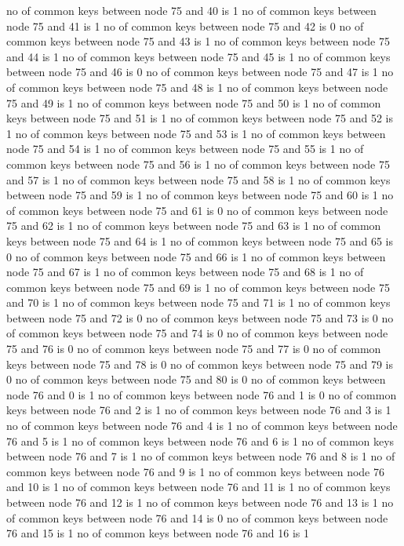 no of common keys between node 75 and 40 is 1
no of common keys between node 75 and 41 is 1
no of common keys between node 75 and 42 is 0
no of common keys between node 75 and 43 is 1
no of common keys between node 75 and 44 is 1
no of common keys between node 75 and 45 is 1
no of common keys between node 75 and 46 is 0
no of common keys between node 75 and 47 is 1
no of common keys between node 75 and 48 is 1
no of common keys between node 75 and 49 is 1
no of common keys between node 75 and 50 is 1
no of common keys between node 75 and 51 is 1
no of common keys between node 75 and 52 is 1
no of common keys between node 75 and 53 is 1
no of common keys between node 75 and 54 is 1
no of common keys between node 75 and 55 is 1
no of common keys between node 75 and 56 is 1
no of common keys between node 75 and 57 is 1
no of common keys between node 75 and 58 is 1
no of common keys between node 75 and 59 is 1
no of common keys between node 75 and 60 is 1
no of common keys between node 75 and 61 is 0
no of common keys between node 75 and 62 is 1
no of common keys between node 75 and 63 is 1
no of common keys between node 75 and 64 is 1
no of common keys between node 75 and 65 is 0
no of common keys between node 75 and 66 is 1
no of common keys between node 75 and 67 is 1
no of common keys between node 75 and 68 is 1
no of common keys between node 75 and 69 is 1
no of common keys between node 75 and 70 is 1
no of common keys between node 75 and 71 is 1
no of common keys between node 75 and 72 is 0
no of common keys between node 75 and 73 is 0
no of common keys between node 75 and 74 is 0
no of common keys between node 75 and 76 is 0
no of common keys between node 75 and 77 is 0
no of common keys between node 75 and 78 is 0
no of common keys between node 75 and 79 is 0
no of common keys between node 75 and 80 is 0
no of common keys between node 76 and 0 is 1
no of common keys between node 76 and 1 is 0
no of common keys between node 76 and 2 is 1
no of common keys between node 76 and 3 is 1
no of common keys between node 76 and 4 is 1
no of common keys between node 76 and 5 is 1
no of common keys between node 76 and 6 is 1
no of common keys between node 76 and 7 is 1
no of common keys between node 76 and 8 is 1
no of common keys between node 76 and 9 is 1
no of common keys between node 76 and 10 is 1
no of common keys between node 76 and 11 is 1
no of common keys between node 76 and 12 is 1
no of common keys between node 76 and 13 is 1
no of common keys between node 76 and 14 is 0
no of common keys between node 76 and 15 is 1
no of common keys between node 76 and 16 is 1
